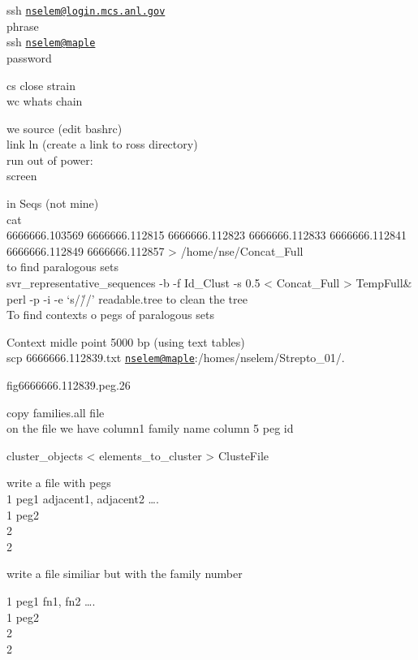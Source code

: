 \documentclass[12pt,twoside]{reedthesis}
\begin{document}
  ssh
  \href{mailto:nselem@login.mcs.anl.gov}{\nolinkurl{nselem@login.mcs.anl.gov}}\\
  phrase\\
  ssh \href{mailto:nselem@maple}{\nolinkurl{nselem@maple}}\\
  password
  
  cs close strain\\
  wc whats chain
  
  we source (edit bashrc)\\
  link ln (create a link to ross directory)\\
  run out of power:\\
  screen
  
  in Seqs (not mine)\\
  cat\\
  6666666.103569 6666666.112815 6666666.112823 6666666.112833
  6666666.112841 6666666.112849 6666666.112857 \textgreater{}
  /home/nse/Concat\_Full\\
  to find paralogous sets\\
  svr\_representative\_sequences -b -f Id\_Clust -s 0.5 \textless{}
  Concat\_Full \textgreater{} TempFull\&\\
  perl -p -i -e `s/\r//' readable.tree to clean the tree\\
  To find contexts o pegs of paralogous sets
  
  Context midle point 5000 bp (using text tables)\\
  scp 6666666.112839.txt
  \href{mailto:nselem@maple}{\nolinkurl{nselem@maple}}:/homes/nselem/Strepto\_01/.
  
  fig\textbar{}6666666.112839.peg.26
  
  copy families.all file\\
  on the file we have column1 family name column 5 peg id
  
  cluster\_objects \textless{} elements\_to\_cluster \textgreater{}
  ClusteFile
  
  write a file with pegs\\
  1 peg1 adjacent1, adjacent2 \ldots{}.\\
  1 peg2\\
  2\\
  2
  
  write a file similiar but with the family number
  
  1 peg1 fn1, fn2 \ldots{}.\\
  1 peg2\\
  2\\
  2
  
\end{document}
